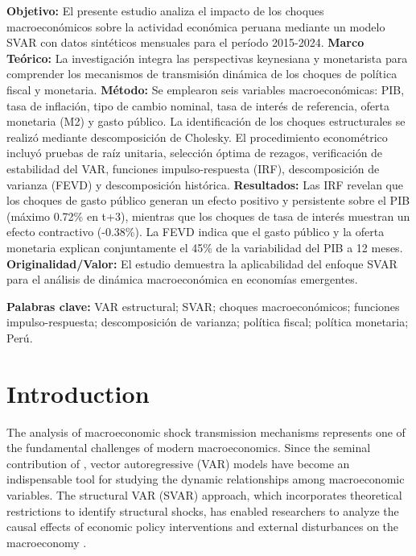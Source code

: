 \documentclass[12pt, a4paper]{article}
\begin{document}
\textbf{Objetivo:} El presente estudio analiza el impacto de los choques macroeconómicos sobre la actividad económica peruana mediante un modelo SVAR con datos sintéticos mensuales para el período 2015-2024. \textbf{Marco Teórico:} La investigación integra las perspectivas keynesiana y monetarista para comprender los mecanismos de transmisión dinámica de los choques de política fiscal y monetaria. \textbf{Método:} Se emplearon seis variables macroeconómicas: PIB, tasa de inflación, tipo de cambio nominal, tasa de interés de referencia, oferta monetaria (M2) y gasto público. La identificación de los choques estructurales se realizó mediante descomposición de Cholesky. El procedimiento econométrico incluyó pruebas de raíz unitaria, selección óptima de rezagos, verificación de estabilidad del VAR, funciones impulso-respuesta (IRF), descomposición de varianza (FEVD) y descomposición histórica. \textbf{Resultados:} Las IRF revelan que los choques de gasto público generan un efecto positivo y persistente sobre el PIB (máximo 0.72\% en t+3), mientras que los choques de tasa de interés muestran un efecto contractivo (-0.38\%). La FEVD indica que el gasto público y la oferta monetaria explican conjuntamente el 45\% de la variabilidad del PIB a 12 meses. \textbf{Originalidad/Valor:} El estudio demuestra la aplicabilidad del enfoque SVAR para el análisis de dinámica macroeconómica en economías emergentes.

\bigskip
\noindent\textbf{Palabras clave:} VAR estructural; SVAR; choques macroeconómicos; funciones impulso-respuesta; descomposición de varianza; política fiscal; política monetaria; Perú.

\newpage

\section{Introduction}

The analysis of macroeconomic shock transmission mechanisms represents one of the fundamental challenges of modern macroeconomics. Since the seminal contribution of \citet{sims1980}, vector autoregressive (VAR) models have become an indispensable tool for studying the dynamic relationships among macroeconomic variables. The structural VAR (SVAR) approach, which incorporates theoretical restrictions to identify structural shocks, has enabled researchers to analyze the causal effects of economic policy interventions and external disturbances on the macroeconomy \citep{blanchard2002, christiano1999, bernanke1992, uhlig2005, kilian2017}.
\end{document}

